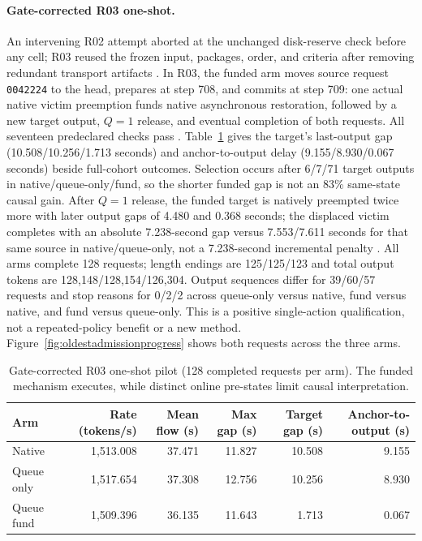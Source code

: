 \documentclass[10pt]{article}
\begin{document}
\paragraph{Gate-corrected R03 one-shot.}
An intervening R02 attempt aborted at the unchanged disk-reserve check before any cell; R03 reused the frozen input, packages, order, and criteria after removing redundant transport artifacts \cite{oldestadmissionplanr03}. In R03, the funded arm moves source request \texttt{0042224} to the head, prepares at step 708, and commits at step 709: one actual native victim preemption funds native asynchronous restoration, followed by a new target output, $Q=1$ release, and eventual completion of both requests. All seventeen predeclared checks pass \cite{oldestadmissionr03}. Table~\ref{tab:oldestadmissionr03} gives the target's last-output gap (10.508/10.256/1.713 seconds) and anchor-to-output delay (9.155/8.930/0.067 seconds) beside full-cohort outcomes. Selection occurs after 6/7/71 target outputs in native/queue-only/fund, so the shorter funded gap is not an 83\% same-state causal gain. After $Q=1$ release, the funded target is natively preempted twice more with later output gaps of 4.480 and 0.368 seconds; the displaced victim completes with an absolute 7.238-second gap versus 7.553/7.611 seconds for that same source in native/queue-only, not a 7.238-second incremental penalty \cite{oldestadmissionfollowup}. All arms complete 128 requests; length endings are 125/125/123 and total output tokens are 128,148/128,154/126,304. Output sequences differ for 39/60/57 requests and stop reasons for 0/2/2 across queue-only versus native, fund versus native, and fund versus queue-only. This is a positive single-action qualification, not a repeated-policy benefit or a new method. Figure~\ref{fig:oldestadmissionprogress} shows both requests across the three arms.

\begin{table}[h]
\centering\small
\caption{Gate-corrected R03 one-shot pilot (128 completed requests per arm). The funded mechanism executes, while distinct online pre-states limit causal interpretation.}
\label{tab:oldestadmissionr03}
\begin{tabular}{lrrrrr}
\toprule
Arm & Rate (tokens/s) & Mean flow (s) & Max gap (s) & Target gap (s) & Anchor-to-output (s) \\
\midrule
Native & 1,513.008 & 37.471 & 11.827 & 10.508 & 9.155 \\
Queue only & 1,517.654 & 37.308 & 12.756 & 10.256 & 8.930 \\
Queue fund & 1,509.396 & 36.135 & 11.643 & 1.713 & 0.067 \\
\bottomrule
\end{tabular}
\end{table}
\end{document}
